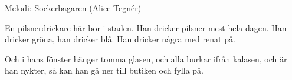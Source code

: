 \begin{song}

\begin{songmeta}
Melodi: Sockerbagaren (Alice Tegnér)
\end{songmeta}

\begin{songtext}
En pilsnerdrickare här bor i staden.
Han dricker pilsner mest hela dagen.
Han dricker gröna, han dricker blå.
Han dricker några med renat på.

Och i hans fönster hänger tomma glasen,
och alla burkar ifrån kalasen,
och är han nykter, så kan han gå
ner till butiken och fylla på.
\end{songtext}
\end{song}
